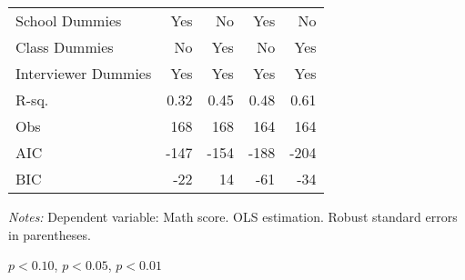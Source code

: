 \begin{table}[!h]
\begin{threeparttable}
\begin{tabular}{l*{4}{D{.}{.}{-1}}}
School Dummies      &                 Yes   &                  No   &                 Yes   &                  No   \\
Class Dummies       &                  No   &                 Yes   &                  No   &                 Yes   \\
Interviewer Dummies &                 Yes   &                 Yes   &                 Yes   &                 Yes   \\
\midrule
R-sq.               &                0.32   &                0.45   &                0.48   &                0.61   \\
Obs                 &                 168   &                 168   &                 164   &                 164   \\
AIC                 &                -147   &                -154   &                -188   &                -204   \\
BIC                 &                 -22   &                  14   &                 -61   &                 -34   \\
\bottomrule
\end{tabular}
\begin{tablenotes}
\footnotesize
\item \textit{Notes:} Dependent variable: Math score. OLS estimation. Robust standard errors in parentheses.
\item \sym{*} \(p<0.10\), \sym{**} \(p<0.05\), \sym{***} \(p<0.01\)
\end{tablenotes}
\end{threeparttable}
\label{tab:rev_cause}
\end{table}